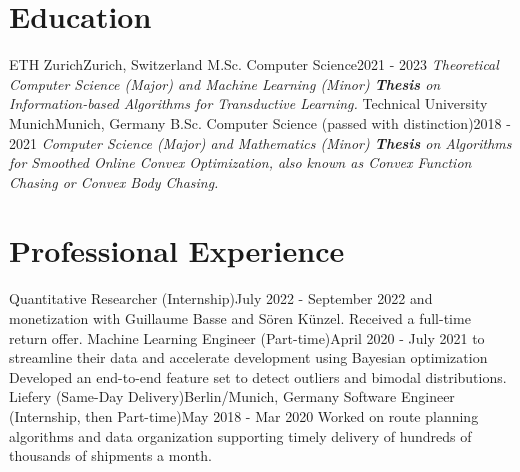 \documentclass[a4paper,20pt]{article}
\begin{document}


\vspace{-5pt}
\section{Education}
  \resumeSubHeadingListStart
    \resumeSubheading
      {ETH Zurich}{Zurich, Switzerland}
      {M.Sc. Computer Science}{2021 - 2023}
      {\scriptsize \textit{ \footnotesize{\newline{}Theoretical Computer Science (Major) and Machine Learning (Minor)}
      \footnotesize{\newline{}\textbf{Thesis} on Information-based Algorithms for Transductive Learning.}}}
    \resumeSubHeadingListEnd
\vspace{-5pt}
  \resumeSubHeadingListStart
    \resumeSubheading
      {Technical University Munich}{Munich, Germany}
      {B.Sc. Computer Science (passed with distinction)}{2018 - 2021}
      {\scriptsize \textit{ \footnotesize{\newline{}Computer Science (Major) and Mathematics (Minor)}
      \footnotesize{\newline{}\textbf{Thesis} on Algorithms for Smoothed Online Convex Optimization, also known as Convex Function Chasing or Convex Body Chasing.}}}
    \resumeSubHeadingListEnd

\vspace{-5pt}
\section{Professional Experience}
  \resumeSubHeadingListStart
    {Quantitative Researcher (Internship)}{July 2022 - September 2022}
    \resumeItemListStart
          {and monetization with Guillaume Basse and Sören Künzel. Received a full-time return offer.}
      \resumeItemListEnd
    {Machine Learning Engineer (Part-time)}{April 2020 - July 2021}
    \resumeItemListStart
          {to streamline their data and accelerate development using Bayesian optimization}
          {Developed an end-to-end feature set to detect outliers and bimodal distributions.}
      \resumeItemListEnd
    \resumeSubheading
		{Liefery (Same-Day Delivery)}{Berlin/Munich, Germany}
		{Software Engineer (Internship, then Part-time)}{May 2018 - Mar 2020}
		\resumeItemListStart
          {Worked on route planning algorithms and data organization supporting timely delivery of hundreds of thousands of shipments a month.}
		\resumeItemListEnd
\resumeSubHeadingListEnd
\end{document}
